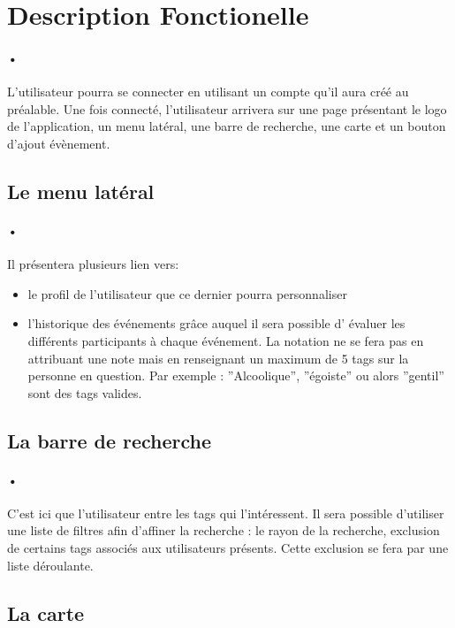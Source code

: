 \documentclass[pdftex,12pt,a4paper]{article}
\begin{document}
\section{Description Fonctionelle}
\paragraph{•}
L'utilisateur pourra se connecter en utilisant un compte qu'il aura cr\'e\'e au pr\'ealable.
Une fois connect\'e, l’utilisateur arrivera sur une page pr\'esentant le logo de l’application, un menu lat\'eral, une barre de recherche, une carte et un bouton d'ajout \'ev\`enement.

\newpage
\subsection{Le menu lat\'eral}
\paragraph{•}
Il pr\'esentera plusieurs lien vers:
\begin{itemize}
 \item le profil de l'utilisateur que ce dernier pourra personnaliser
\item l'historique des \'ev\'enements gr\^ace auquel il sera possible d' \'evaluer les diff\'erents participants \`a chaque \'ev\'enement. La notation ne se fera pas en attribuant une note mais en renseignant un maximum de 5 tags sur la personne en question. Par exemple : ''Alcoolique'', ''\'egoiste'' ou alors ''gentil'' sont des tags valides. 
\end{itemize}

\subsection{La barre de recherche}
\paragraph{•}
C'est ici que l'utilisateur entre les tags qui l'int\'eressent. Il sera possible d'utiliser une liste de filtres afin d'affiner la recherche : le rayon de la recherche, exclusion de certains tags associ\'es aux utilisateurs pr\'esents. Cette exclusion se fera par une liste déroulante.

\subsection{La carte}
\end{document}
